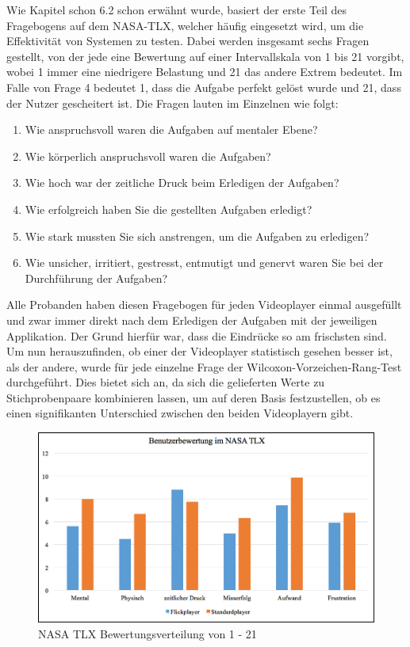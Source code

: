 \documentclass[11pt,a4paper]{report}
\begin{document}
Wie Kapitel schon 6.2 schon erwähnt wurde, basiert der erste Teil des Fragebogens auf dem NASA-TLX, welcher häufig eingesetzt wird, um die Effektivität von Systemen zu testen. Dabei werden insgesamt sechs Fragen gestellt, von der jede eine Bewertung auf einer Intervallskala von 1 bis 21 vorgibt, wobei 1 immer eine niedrigere Belastung und 21 das andere Extrem bedeutet. Im Falle von Frage 4 bedeutet 1, dass die Aufgabe perfekt gelöst wurde und 21, dass der Nutzer gescheitert ist. Die Fragen lauten im Einzelnen wie folgt:
\begin{enumerate}
\item	Wie anspruchsvoll waren die Aufgaben auf mentaler Ebene?
\item	Wie körperlich anspruchsvoll waren die Aufgaben?
\item	Wie hoch war der zeitliche Druck beim Erledigen der Aufgaben?
\item	Wie erfolgreich haben Sie die gestellten Aufgaben erledigt?
\item	Wie stark mussten Sie sich anstrengen, um die Aufgaben zu erledigen?
\item	Wie unsicher, irritiert, gestresst, entmutigt und genervt waren Sie bei der Durchführung der Aufgaben?
\end{enumerate}
Alle Probanden haben diesen Fragebogen für jeden Videoplayer einmal ausgefüllt und zwar immer direkt nach dem Erledigen der Aufgaben mit der jeweiligen Applikation. Der Grund hierfür war, dass die Eindrücke so am frischsten sind. Um nun herauszufinden, ob einer der Videoplayer statistisch gesehen besser ist, als der andere, wurde für jede einzelne Frage der Wilcoxon-Vorzeichen-Rang-Test durchgeführt. Dies bietet sich an, da sich die gelieferten Werte zu Stichprobenpaare kombinieren lassen, um auf deren Basis festzustellen, ob es einen signifikanten Unterschied zwischen den beiden Videoplayern gibt.
\begin{figure}[h]
\begin{center}
\includegraphics[scale=0.9]{./images/37.png}
\caption{NASA TLX Bewertungsverteilung von 1 - 21}
\label{nasa_tlx}
\end{center}
\end{figure}
\end{document}
